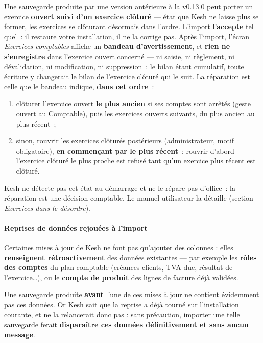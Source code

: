 \documentclass[a4paper,11pt,oneside]{article}
\begin{document}
Une sauvegarde produite par une version antérieure à la v0.13.0 peut porter un exercice \textbf{ouvert suivi d'un exercice clôturé} --- état que Kesh ne laisse plus se former, les exercices se clôturant désormais dans l'ordre. L'import l'\textbf{accepte} tel quel~: il restaure votre installation, il ne la corrige pas. Après l'import, l'écran \emph{Exercices comptables} affiche un \textbf{bandeau d'avertissement}, et \textbf{rien ne s'enregistre} dans l'exercice ouvert concerné --- ni saisie, ni règlement, ni dévalidation, ni modification, ni suppression~: le bilan étant cumulatif, toute écriture y changerait le bilan de l'exercice clôturé qui le suit. La réparation est celle que le bandeau indique, \textbf{dans cet ordre}~:

\begin{enumerate}
    \item clôturer l'exercice ouvert \textbf{le plus ancien} si ses comptes sont arrêtés (geste ouvert au Comptable), puis les exercices ouverts suivants, du plus ancien au plus récent~;
    \item sinon, rouvrir les exercices clôturés postérieurs (administrateur, motif obligatoire), \textbf{en commençant par le plus récent}~: rouvrir d'abord l'exercice clôturé le plus proche est refusé tant qu'un exercice plus récent est clôturé.
\end{enumerate}

Kesh ne détecte pas cet état au démarrage et ne le répare pas d'office~: la réparation est une décision comptable. Le manuel utilisateur la détaille (section \emph{Exercices dans le désordre}).

\paragraph{Reprises de données rejouées à l'import}

Certaines mises à jour de Kesh ne font pas qu'ajouter des colonnes : elles \textbf{renseignent rétroactivement} des données existantes — par exemple les \textbf{rôles des comptes} du plan comptable (créances clients, TVA due, résultat de l'exercice…), ou le \textbf{compte de produit} des lignes de facture déjà validées.

Une sauvegarde produite \textbf{avant} l'une de ces mises à jour ne contient évidemment pas ces données. Or Kesh sait que la reprise a déjà tourné sur l'installation courante, et ne la relancerait donc pas : sans précaution, importer une telle sauvegarde ferait \textbf{disparaître ces données définitivement et sans aucun message}.
\end{document}
